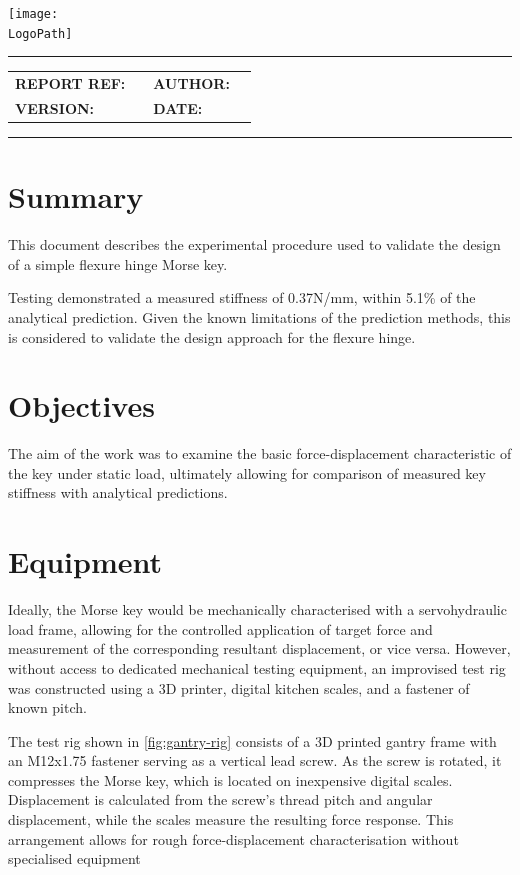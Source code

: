 \documentclass[10pt]{article}
\makeatletter
\newcommand{\customtitle}{%
  \noindent
  \begin{minipage}[t]{0.65\textwidth}
    \vspace{-0.5cm}
    {\ocrfamily\Large\bfseries \DocumentType \par}
  \end{minipage}%
  \begin{minipage}[t]{0.35\textwidth}
    \flushright{}
    \texttt{[image: \\LogoPath]}
  \end{minipage}

  \vspace{0.3cm}
  \hrule height 0.8pt
  \vspace{0.3cm}

  {\ocrfamily\bfseries\ProjectFullRef\par}
  {\ocrfamily\large\bfseries\ReportTitle\par}

  \vspace{0.5em}

  \begin{tabular}{@{}ll@{\hspace{2cm}}ll@{}}
    \ocrfamily\textbf{REPORT REF:} & \ocrfamily \ReportRef &
    \ocrfamily\textbf{AUTHOR:}     & \ocrfamily \AuthorName \\

    \ocrfamily\textbf{VERSION:}    & \ocrfamily \DocVersion &
    \ocrfamily\textbf{DATE:}       & \ocrfamily \ReleaseDate \\
  \end{tabular}

  \vspace{0.3cm}
  \hrule height 0.8pt
  \vspace{0.25cm}
}
\makeatother
\begin{document}
\vspace*{-1cm}
\thispagestyle{plain}
\customtitle{}

\section{Summary}

This document describes the experimental procedure used to validate the design of a simple flexure
hinge Morse key.

Testing demonstrated a measured stiffness of 0.37N/mm, within 5.1\% of the
analytical prediction. Given the known limitations of the prediction methods, this is considered to
validate the design approach for the flexure hinge.

\section{Objectives}

The aim of the work was to examine the basic force-displacement characteristic of the key under
static load, ultimately allowing for comparison of measured key stiffness with analytical
predictions.

\section{Equipment}

Ideally, the Morse key would be mechanically characterised with a servohydraulic load frame,
allowing for the controlled application of target force and measurement of the corresponding
resultant displacement, or vice versa. However, without access to dedicated mechanical testing
equipment, an improvised test rig was constructed using a 3D printer, digital kitchen scales, and a
fastener of known pitch.

The test rig shown in \autoref{fig:gantry-rig} consists of a 3D printed gantry frame with an
M12x1.75 fastener serving as a vertical lead screw. As the screw is rotated, it compresses the
Morse key, which is located on inexpensive digital scales. Displacement is calculated from the
screw's thread pitch and angular displacement, while the scales measure the resulting force
response. This arrangement allows for rough force-displacement characterisation without specialised
equipment
\end{document}
